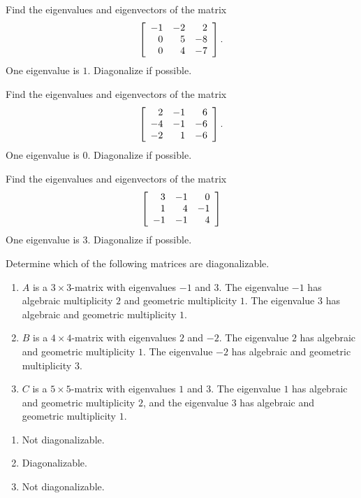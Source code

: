 \documentclass{ximera}
\begin{document}
\begin{example}
  Find the eigenvalues and eigenvectors of the matrix
  \begin{equation*}
    \startmat{rrr}
      -1 & -2 & 2 \\
      0 & 5 & -8 \\
      0 & 4 & -7 \\
    \stopmat.
  \end{equation*}
  One eigenvalue is $1$. Diagonalize if possible.
\end{example}

\begin{example}
  Find the eigenvalues and eigenvectors of the matrix
  \begin{equation*}
    \startmat{rrr}
      2 &  -1 &   6 \\
      -4 &  -1 &  -6 \\
      -2 &   1 &  -6 \\
    \stopmat.
  \end{equation*}
  One eigenvalue is $0$. Diagonalize if possible.
\end{example}

\begin{example}
  Find the eigenvalues and eigenvectors of the matrix
  \begin{equation*}
    \startmat{rrr}
      3 &  -1 &   0 \\
      1 &   4 &  -1 \\
      -1 & -1 &   4 \\
    \stopmat
  \end{equation*}
  One eigenvalue is $3$. Diagonalize if possible.
\end{example}

\begin{problem}
  Determine which of the following matrices are diagonalizable.
  \begin{enumerate}
  \item $A$ is a $3\times 3$-matrix with eigenvalues $-1$ and $3$. The
    eigenvalue $-1$ has algebraic multiplicity $2$ and geometric
    multiplicity $1$. The eigenvalue $3$ has algebraic and geometric
    multiplicity $1$.
  \item $B$ is a $4\times 4$-matrix with eigenvalues $2$ and $-2$. The
    eigenvalue $2$ has algebraic and geometric multiplicity $1$. The
    eigenvalue $-2$ has algebraic and geometric multiplicity $3$.
  \item $C$ is a $5\times 5$-matrix with eigenvalues $1$ and $3$. The
    eigenvalue $1$ has algebraic and geometric multiplicity $2$, and
    the eigenvalue $3$ has algebraic and geometric multiplicity $1$.
  \end{enumerate}
  \begin{solution}
    \begin{enumerate}
    \item Not diagonalizable.
    \item Diagonalizable.
    \item Not diagonalizable.
    \end{enumerate}
  \end{solution}
\end{problem}
\end{document}
